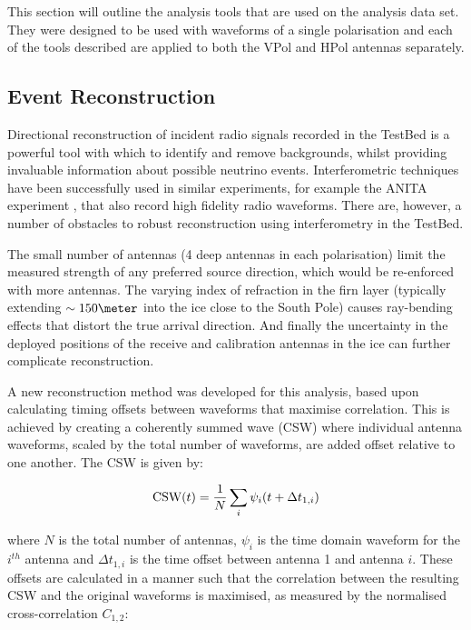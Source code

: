 This section will outline the analysis tools that are used on the analysis data set. They were designed to be used with waveforms of a single polarisation and each of the tools described are applied to both the VPol and HPol antennas separately.


\subsection{Event Reconstruction}
\label{sec:Analysis:Reconstruction}

Directional reconstruction of incident radio signals recorded in the TestBed is a powerful tool with which to identify and remove backgrounds, whilst providing invaluable information about possible neutrino events. Interferometric techniques have been successfully used in similar experiments, for example the ANITA experiment \cite{HooverThesis} \cite{AbbyThesis} \cite{MattThesis} \cite{AndresThesis}, that also record high fidelity radio waveforms. There are, however, a number of obstacles to robust reconstruction using interferometry in the TestBed. 

The small number of antennas (4 deep antennas in each polarisation) limit the measured strength of any preferred source direction, which would be re-enforced with more antennas. The varying index of refraction in the firn layer (typically extending $\sim 150 \meter$ into the ice close to the South Pole) causes ray-bending effects that distort the true arrival direction. And finally the uncertainty in the deployed positions of the receive and calibration antennas in the ice can further complicate reconstruction. 


A new reconstruction method was developed for this analysis, based upon calculating timing offsets between waveforms that maximise correlation. This is achieved by creating a coherently summed wave (CSW) where individual antenna waveforms, scaled by the total number of waveforms, are added offset relative to one another. The CSW is given by:

\begin{equation}
  \mbox{CSW}(t) = \frac{1}{N}\sum_{i} \psi_{i}(t+\Delta t_{1,i})\\
\end{equation}

where  $N$ is the total number of antennas, $\psi_{i}$ is the time domain waveform for the $i^{th}$ antenna and $\Delta t_{1,i}$ is the time offset between antenna 1 and antenna $i$. These offsets are calculated in a manner such that the correlation between the resulting CSW and the original waveforms is maximised, as measured by the normalised cross-correlation $C_{1,2}$:


